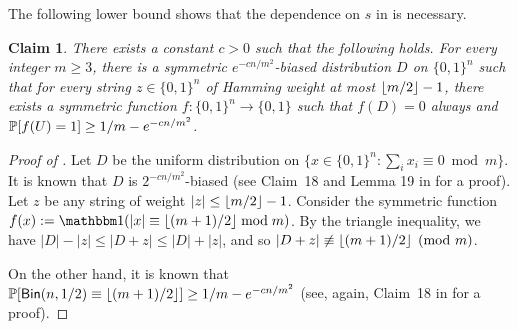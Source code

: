 \documentclass[10pt,a4paper]{article}
\newtheorem{claim}[theorem]{Claim}
\theoremstyle{definition}
\renewcommand{\Pr}{\mathop{\mathbb{P}\/}}
\newcommand{\bbone}{\mathbbm 1}
\newcommand{\Id}{\bbone}
\newcommand{\zo}{\{0,1\}}
\DeclarePairedDelimiter\floor{\lfloor}{\rfloor}
\def\Bin{\mathsf{Bin}}
\begin{document}
The following lower bound shows that the dependence on $s$ in  is necessary.

\begin{claim} \label{claim:shifted-sym-bias-lb}
  There exists a constant $c > 0$ such that the following holds.
  For every integer $m \ge 3$, there is a symmetric $e^{-cn/m^2}$-biased distribution $D$ on $\zo^n$ such that for every string $z \in \zo^n$ of Hamming weight at most $\floor{m/2}-1$, there exists a symmetric function $f\colon \zo^n \to \zo$ such that $f(D)=0$ always and $\Pr[f(U) = 1] \ge 1/m - e^{-cn/m^2}$.
\end{claim}


\begin{proof}[Proof of ]
  Let $D$ be the uniform distribution on $\{ x \in \zo^n: \sum_i x_i \equiv 0 \bmod m\}$.
  It is known that $D$ is $2^{-cn/m^2}$-biased (see Claim~18 and Lemma 19 in \cite{BIJLSV21} for a proof). Let $z$ be any string of weight $|z| \le \floor{m/2}-1$.
  Consider the symmetric function $f(x) := \Id(|x| \equiv \floor{(m+1)/2} \bmod m)$.
  By the triangle inequality, we have $|D|-|z| \le |D+z| \le |D|+|z|$, and so $|D+z| \not\equiv \floor{(m+1)/2} \pmod m$.

  On the other hand, it is known that $\Pr[\Bin(n,1/2) \equiv \floor{(m+1)/2}] \ge 1/m - e^{-cn/m^2}$ (see, again, Claim~18 in \cite{BIJLSV21} for a proof).
\end{proof}
\end{document}

